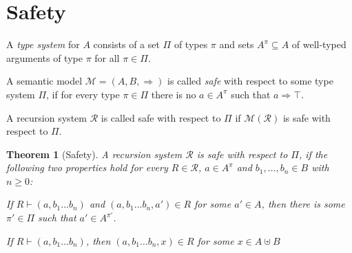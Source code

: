 \documentclass[a4paper,final,preprint,sort&compress]{elsarticle}
\newtheorem{theorem}[definition]{Theorem}
\newtheorem{lemma}[definition]{Lemma}
\newcommand{\M}{\ensuremath{\mathcal{M}}}
\newcommand{\R}{\ensuremath{\mathcal{R}}}
\begin{document}
\section{Safety}
\label{sec:Safety}


A \emph{type system} for $A$ consists of a set $\Pi$ of types $\pi$ and sets $A^\pi \subseteq A$
of well-typed arguments of type $\pi$ for all $\pi \in \Pi$.

\begin{definition} \label{def:Safety}
  A semantic model $\mathcal{M} = (A,B,\Rightarrow)$ is called \emph{safe} with respect to
  some type system $\Pi$, if for every type $\pi \in \Pi$ there is no $a \in A^\pi$ such that
  $a \Rightarrow \top$.
\end{definition}

A recursion system $\R$ is called safe with respect to $\Pi$ if $\M(\R)$ is safe with
respect to $\Pi$.



\begin{theorem}[Safety]
  A recursion system $\R$ is safe with respect to $\Pi$, if the following two properties 
  hold for every $R \in \R$, $a \in A^\pi$ and $b_1,\ldots,b_n \in B$ with $n \ge 0$:
  \begin{description}[labelindent=\parindent,style=nextline]
  \item[Local Preservation]

    If \mbox{$R \vdash (a,b_1 \ldots b_n)$} and \mbox{$(a,b_1 \ldots b_n,a') \in R$} for
    some $a' \in A$, then there is some $\pi' \in \Pi$ such that $a' \in A^{\pi'}$.

  \item[Local Progress]

    If \mbox{$R \vdash (a,b_1 \ldots b_n)$}, then \mbox{$(a,b_1 \ldots b_n,x) \in R$} for
    some \mbox{$x \in A \uplus B$}

  \end{description}
\end{theorem}
\end{document}
